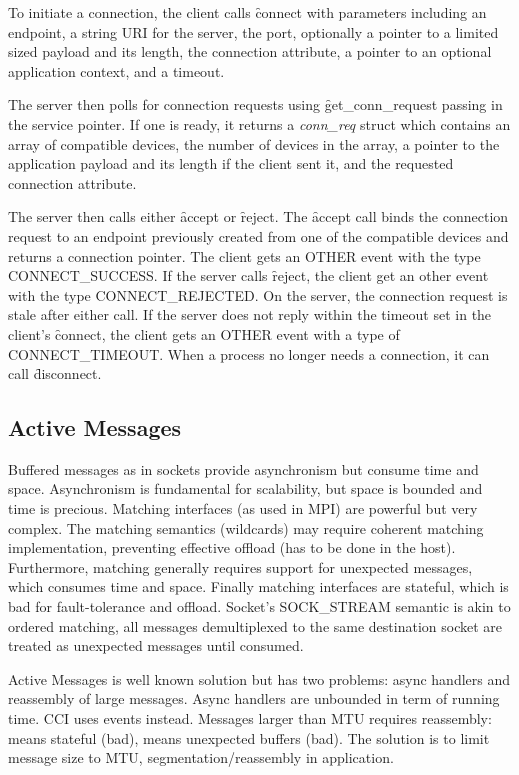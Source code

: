 \documentclass[conference]{IEEEtran}
\begin{document}
To initiate a connection, the client calls \f{connect} with parameters including an
endpoint, a string URI for the server, the port, optionally a pointer to a limited sized
payload and its length, the connection attribute, a pointer to an optional application
context, and a timeout.

The server then polls for connection requests using \f{get\_conn\_request} passing in the
service pointer. If one is ready, it returns a \emph{conn\_req} struct which contains an
array of compatible devices, the number of devices in the array, a pointer to the
application payload and its length if the client sent it, and the requested connection
attribute.

The server then calls either \f{accept} or \f{reject}. The \f{accept} call binds the
connection request to an endpoint previously created from one of the compatible devices
and returns a connection pointer. The client gets an OTHER event with the type
CONNECT\_SUCCESS. If the server calls \f{reject}, the client get an other event with the
type CONNECT\_REJECTED.  On the server, the connection request is stale after either call.
If the server does not reply within the timeout set in the client's \f{connect}, the
client gets an OTHER event with a type of CONNECT\_TIMEOUT. When a process no longer needs
a connection, it can call \f{disconnect}.

\subsection{Active Messages}

Buffered messages as in sockets provide asynchronism but consume time and 
space. Asynchronism is fundamental for scalability, but space is bounded and 
time is precious. 
Matching interfaces (as used in MPI) are powerful but very complex. The 
matching semantics (wildcards) may require coherent matching implementation, 
preventing effective offload (has to be done in the host). Furthermore, 
matching generally requires support for unexpected messages, which consumes 
time and space. Finally matching interfaces are stateful, which is bad for 
fault-tolerance and offload.  Socket's SOCK\_STREAM semantic is akin to 
ordered matching, all messages demultiplexed to the same destination socket 
are treated as unexpected messages until consumed.

Active Messages is well known solution but has two problems: async handlers 
and reassembly of large messages.  Async handlers are unbounded in term of 
running time. CCI uses events instead.  Messages larger than MTU requires 
reassembly: means stateful (bad), means unexpected buffers (bad). The solution 
is to limit message size to MTU, segmentation/reassembly in application.
\end{document}
